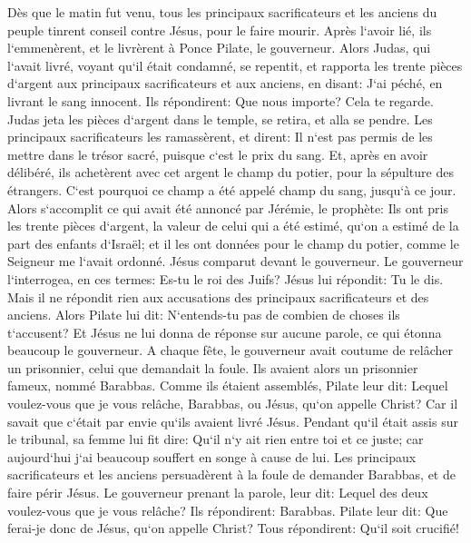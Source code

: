 \verse Dès que le matin fut venu, tous les principaux sacrificateurs et les anciens du peuple tinrent conseil contre Jésus, pour le faire mourir. 
\verse Après l`avoir lié, ils l`emmenèrent, et le livrèrent à Ponce Pilate, le gouverneur. 
\verse Alors Judas, qui l`avait livré, voyant qu`il était condamné, se repentit, et rapporta les trente pièces d`argent aux principaux sacrificateurs et aux anciens, 
\verse en disant: J`ai péché, en livrant le sang innocent. Ils répondirent: Que nous importe? Cela te regarde. 
\verse Judas jeta les pièces d`argent dans le temple, se retira, et alla se pendre. 
\verse Les principaux sacrificateurs les ramassèrent, et dirent: Il n`est pas permis de les mettre dans le trésor sacré, puisque c`est le prix du sang. 
\verse Et, après en avoir délibéré, ils achetèrent avec cet argent le champ du potier, pour la sépulture des étrangers. 
\verse C`est pourquoi ce champ a été appelé champ du sang, jusqu`à ce jour. 
\verse Alors s`accomplit ce qui avait été annoncé par Jérémie, le prophète: Ils ont pris les trente pièces d`argent, la valeur de celui qui a été estimé, qu`on a estimé de la part des enfants d`Israël; 
\verse et il les ont données pour le champ du potier, comme le Seigneur me l`avait ordonné. 
\verse Jésus comparut devant le gouverneur. Le gouverneur l`interrogea, en ces termes: Es-tu le roi des Juifs? Jésus lui répondit: Tu le dis. 
\verse Mais il ne répondit rien aux accusations des principaux sacrificateurs et des anciens. 
\verse Alors Pilate lui dit: N`entends-tu pas de combien de choses ils t`accusent? 
\verse Et Jésus ne lui donna de réponse sur aucune parole, ce qui étonna beaucoup le gouverneur. 
\verse A chaque fête, le gouverneur avait coutume de relâcher un prisonnier, celui que demandait la foule. 
\verse Ils avaient alors un prisonnier fameux, nommé Barabbas. 
\verse Comme ils étaient assemblés, Pilate leur dit: Lequel voulez-vous que je vous relâche, Barabbas, ou Jésus, qu`on appelle Christ? 
\verse Car il savait que c`était par envie qu`ils avaient livré Jésus. 
\verse Pendant qu`il était assis sur le tribunal, sa femme lui fit dire: Qu`il n`y ait rien entre toi et ce juste; car aujourd`hui j`ai beaucoup souffert en songe à cause de lui. 
\verse Les principaux sacrificateurs et les anciens persuadèrent à la foule de demander Barabbas, et de faire périr Jésus. 
\verse Le gouverneur prenant la parole, leur dit: Lequel des deux voulez-vous que je vous relâche? Ils répondirent: Barabbas. 
\verse Pilate leur dit: Que ferai-je donc de Jésus, qu`on appelle Christ? Tous répondirent: Qu`il soit crucifié! 
